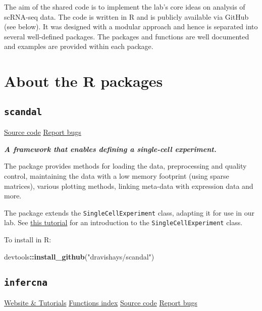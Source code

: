 \documentclass[]{book}
\newenvironment{Shaded}{\begin{snugshade}}{\end{snugshade}}
\newcommand{\KeywordTok}[1]{\textcolor[rgb]{0.13,0.29,0.53}{\textbf{#1}}}
\newcommand{\StringTok}[1]{\textcolor[rgb]{0.31,0.60,0.02}{#1}}
\newcommand{\OperatorTok}[1]{\textcolor[rgb]{0.81,0.36,0.00}{\textbf{#1}}}
\newcommand{\NormalTok}[1]{#1}
\begin{document}
The aim of the shared code is to implement the lab's core ideas on
analysis of scRNA-seq data. The code is written in R and is publicly
available via GitHub (see below). It was designed with a modular
approach and hence is separated into several well-defined packages. The
packages and functions are well documented and examples are provided
within each package.

\section{About the R packages}\label{about-the-r-packages}

\subsection{\texorpdfstring{\texttt{scandal}}{scandal}}\label{scandal}

\href{https://github.com/dravishays/scandal}{Source code} \textbar{}
\href{https://github.com/dravishays/scandal/issues}{Report bugs}

\emph{\textbf{A framework that enables defining a single-cell
experiment.}}

The package provides methods for loading the data, preprocessing and
quality control, maintaining the data with a low memory footprint (using
sparse matrices), various plotting methods, linking meta-data with
expression data and more.

The package extends the \texttt{SingleCellExperiment} class, adapting it
for use in our lab. See
\href{https://www.bioconductor.org/packages/release/bioc/vignettes/SingleCellExperiment/inst/doc/intro.html}{this
tutorial} for an introduction to the \texttt{SingleCellExperiment}
class.

To install in R:

\begin{Shaded}
\begin{Highlighting}[]
\NormalTok{devtools}\OperatorTok{::}\KeywordTok{install_github}\NormalTok{(}\StringTok{"dravishays/scandal"}\NormalTok{)}
\end{Highlighting}
\end{Shaded}

\subsection{\texorpdfstring{\texttt{infercna}}{infercna}}\label{infercna}

\href{https://jlaffy.github.io/infercna}{Website \& Tutorials}
\textbar{}
\href{https://jlaffy.github.io/infercna/reference/index.html}{Functions
index} \textbar{} \href{https://github.com/jlaffy/infercna}{Source code}
\textbar{} \href{https://github.com/jlaffy/infercna/issues}{Report bugs}
\end{document}
